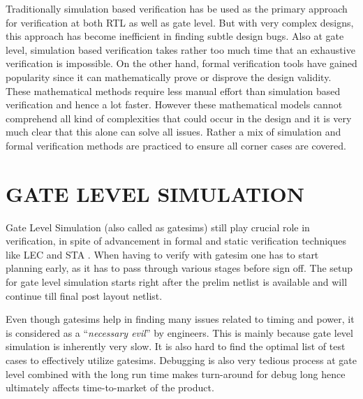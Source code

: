  Traditionally simulation based verification has be used as the primary approach for verification at both RTL as well as gate level.  But with very complex designs, this approach has become inefficient in finding subtle design bugs. Also at gate level, simulation based verification takes rather too much time that an exhaustive verification is impossible. On the other hand, formal verification tools have gained popularity since it can mathematically prove or disprove the design validity. These mathematical methods require less manual effort than simulation based verification and hence a lot faster. However these mathematical models cannot comprehend all kind of complexities that could occur in the design and it is very much clear that this alone can solve all issues. Rather a mix of simulation and formal verification methods are practiced to ensure all corner cases are covered. 


\section{GATE LEVEL SIMULATION}

Gate Level Simulation (also called as gatesims) still play crucial role in verification, in spite of advancement in formal and static verification techniques like LEC  and STA \cite{ieee:segev:2004}.   When having to verify with gatesim one has to start planning early, as it has to pass through various stages before sign off. The setup for gate level simulation starts right after the prelim netlist is available and will continue till final post layout netlist.  

Even though gatesims help in finding many issues related to timing and power, it is considered as a ``{\it necessary evil}'' by engineers. This is mainly because gate level simulation is inherently very slow. It is also hard to find the optimal list of test cases to effectively utilize gatesims. Debugging is also very tedious process at gate level combined with the long run time makes turn-around for debug long hence ultimately affects time-to-market of the product.

